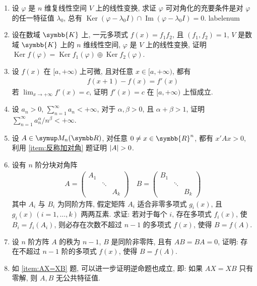 \documentclass{ctexart}
\makeatletter
\def\asteriskitem{*}
\def\sitem{%
  \expandafter\let\expandafter\originallabel\csname labelenum\romannumeral\@enumdepth\endcsname
  \expandafter\def\csname labelenum\romannumeral\@enumdepth\expandafter\endcsname\expandafter{%
    \expandafter\bfseries\expandafter\color{red}\expandafter{\expandafter\asteriskitem\expandafter\originallabel}}%
  \item
  \expandafter\let\csname labelenum\romannumeral\@enumdepth\endcsname\originallabel
}
\newcommand{\limit}[2]{\lim_{#1 \to #2}}
\newcommand{\R}{\ensuremath{\symbb{R}}}
\newcommand{\K}{\ensuremath{\symbb{K}}}
\DeclareMathOperator{\Image}{Im}
\DeclareMathOperator{\Ker}{Ker}
\makeatother
\begin{document}
\begin{enumerate}[series=exer]
    \item 设 $ \varphi $ 是 $ n $ 维复线性空间 $ V $ 上的线性变换, 求证 $ \varphi $ 可对角化的充要条件是对 $ \varphi $ 的任一特征值 $ \lambda_{0} $, 总有 $ \Ker(\varphi - \lambda_{0}I) \cap \Image(\varphi - \lambda_{0}I) = 0 $. 
    \sitem 设在数域 $ \K $ 上, 一元多项式 $ f(x) = f_{1}f_{2} $, 且 $ (f_{1}, f_{2}) = 1 $, $ V $ 是数域 $ \K $ 上的 $ n $ 维线性空间, $ \varphi $ 是 $ V $ 上的线性变换, 证明 $ \Ker f(\varphi) = \Ker f_{1}(\varphi) \oplus \Ker f_{2}(\varphi) $. 
    \item 设 $ f(x) $ 在 $ [a, +\infty) $ 上可微, 且对任意 $ x \in [a, +\infty) $, 都有
    \begin{align*}
        f(x+1) - f(x) = f'(x)
    \end{align*}
    若 $ \limit{x}{+\infty}f'(x) = c $, 证明 $ f'(x) = c $ 在 $ [a, +\infty) $ 上恒成立.
    \item 设 $ a_{n} > 0 $, $ \sum_{n=1}^{\infty}a_{n} < +\infty $, 对于 $ \alpha, \beta > 0 $, 且 $ \alpha + \beta > 1 $, 证明 $ \sum_{n=1}^{\infty} a_{n}^{\alpha}/n^{\beta} < +\infty $. 
    \item 设 $ A \in \MM $, 对任意 $ 0\ne x \in \R^{n} $, 都有 $ x'Ax > 0 $, 利用 \ref{item:反称加对角} 题证明 $ \abs{A} > 0 $.
    \item 设有 $ n $ 阶分块对角阵 
    \begin{align*}
        A = \begin{pmatrix}
            A_{1} & & \\
            & \ddots & \\
            & & A_{k}
        \end{pmatrix}\quad 
        B = \begin{pmatrix}
            B_{1} & & \\
            & \ddots & \\
            & & B_{k}
        \end{pmatrix}
    \end{align*}
    其中 $ A_{i} $ 与 $ B_{i} $ 为同阶方阵, 假定矩阵 $ A_{i} $ 适合非零多项式 $ g_{i}(x) $, 且 $ g_{i}(x)\,(i = 1, \dots, k) $ 两两互素. 求证: 若对于每个 $ i $, 存在多项式 $ f_{i}(x) $, 使 $ B_{i} = f_{i}(A_{i}) $, 则必存在次数不超过 $ n-1 $ 的多项式 $ f(x) $, 使得 $ B = f(A) $.
    \item 设 $ n $ 阶方阵 $ A $ 的秩为 $ n-1 $, $ B $ 是同阶非零阵, 且有 $ AB = BA = 0 $, 证明: 存在不超过 $ n-1 $ 阶的多项式 $ f(x) $, 使得 $ B = f(A) $.
    \item 如 \ref{item:AX=XB} 题, 可以进一步证明逆命题也成立, 即: 如果 $ AX = XB $ 只有零解, 则 $ A, B $ 无公共特征值.

\end{enumerate}
\end{document}
